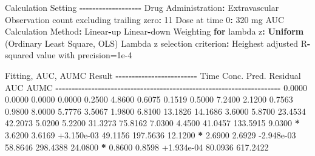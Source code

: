 \documentclass[
  12pt,
]{krantz}
\newenvironment{Shaded}{\begin{snugshade}}{\end{snugshade}}
\newcommand{\ControlFlowTok}[1]{\textcolor[rgb]{0.13,0.29,0.53}{\textbf{#1}}}
\newcommand{\DecValTok}[1]{\textcolor[rgb]{0.00,0.00,0.81}{#1}}
\newcommand{\FloatTok}[1]{\textcolor[rgb]{0.00,0.00,0.81}{#1}}
\newcommand{\KeywordTok}[1]{\textcolor[rgb]{0.13,0.29,0.53}{\textbf{#1}}}
\newcommand{\NormalTok}[1]{#1}
\newcommand{\OperatorTok}[1]{\textcolor[rgb]{0.81,0.36,0.00}{\textbf{#1}}}
\newcommand{\StringTok}[1]{\textcolor[rgb]{0.31,0.60,0.02}{#1}}
\begin{document}
\begin{Shaded}
\begin{Highlighting}[]
\NormalTok{Calculation Setting}
\OperatorTok{{-}{-}{-}{-}{-}{-}{-}{-}{-}{-}{-}{-}{-}{-}{-}{-}{-}{-}{-}}
\NormalTok{Drug Administration}\OperatorTok{:}\StringTok{ }\NormalTok{Extravascular}
\NormalTok{Observation count excluding trailing zero}\OperatorTok{:}\StringTok{ }\DecValTok{11}
\NormalTok{Dose at time }\DecValTok{0}\OperatorTok{:}\StringTok{ }\DecValTok{320}\NormalTok{ mg}
\NormalTok{AUC Calculation Method}\OperatorTok{:}\StringTok{ }\NormalTok{Linear}\OperatorTok{{-}}\NormalTok{up Linear}\OperatorTok{{-}}\NormalTok{down}
\NormalTok{Weighting }\ControlFlowTok{for}\NormalTok{ lambda z}\OperatorTok{:}\StringTok{ }\KeywordTok{Uniform}\NormalTok{ (Ordinary Least Square, OLS)}
\NormalTok{Lambda z selection criterion}\OperatorTok{:}\StringTok{ }\NormalTok{Heighest adjusted R}\OperatorTok{{-}}\NormalTok{squared value with precision=}\FloatTok{1e{-}4}


\NormalTok{Fitting, AUC, AUMC Result}
\OperatorTok{{-}{-}{-}{-}{-}{-}{-}{-}{-}{-}{-}{-}{-}{-}{-}{-}{-}{-}{-}{-}{-}{-}{-}{-}{-}}
\StringTok{      }\NormalTok{Time         Conc.      Pred.   Residual       AUC       AUMC}
\OperatorTok{{-}{-}{-}{-}{-}{-}{-}{-}{-}{-}{-}{-}{-}{-}{-}{-}{-}{-}{-}{-}{-}{-}{-}{-}{-}{-}{-}{-}{-}{-}{-}{-}{-}{-}{-}{-}{-}{-}{-}{-}{-}{-}{-}{-}{-}{-}{-}{-}{-}{-}{-}{-}{-}{-}{-}{-}{-}{-}{-}{-}{-}{-}{-}{-}{-}{-}{-}{-}{-}}
\StringTok{     }\FloatTok{0.0000}       \FloatTok{0.0000}                           \FloatTok{0.0000}     \FloatTok{0.0000}
     \FloatTok{0.2500}       \FloatTok{4.8600}                           \FloatTok{0.6075}     \FloatTok{0.1519}
     \FloatTok{0.5000}       \FloatTok{7.2400}                           \FloatTok{2.1200}     \FloatTok{0.7563}
     \FloatTok{0.9800}       \FloatTok{8.0000}                           \FloatTok{5.7776}     \FloatTok{3.5067}
     \FloatTok{1.9800}       \FloatTok{6.8100}                          \FloatTok{13.1826}    \FloatTok{14.1686}
     \FloatTok{3.6000}       \FloatTok{5.8700}                          \FloatTok{23.4534}    \FloatTok{42.2073}
     \FloatTok{5.0200}       \FloatTok{5.2200}                          \FloatTok{31.3273}    \FloatTok{75.8162}
     \FloatTok{7.0300}       \FloatTok{4.4500}                          \FloatTok{41.0457}   \FloatTok{133.5915}
     \FloatTok{9.0300} \OperatorTok{*}\StringTok{     }\FloatTok{3.6200}     \FloatTok{3.6169} \FloatTok{+3.150e{-}03}    \FloatTok{49.1156}   \FloatTok{197.5636}
    \FloatTok{12.1200} \OperatorTok{*}\StringTok{     }\FloatTok{2.6900}     \FloatTok{2.6929} \FloatTok{{-}2.948e{-}03}    \FloatTok{58.8646}   \FloatTok{298.4388}
    \FloatTok{24.0800} \OperatorTok{*}\StringTok{     }\FloatTok{0.8600}     \FloatTok{0.8598} \FloatTok{+1.934e{-}04}    \FloatTok{80.0936}   \FloatTok{617.2422}


\end{Highlighting}
\end{Shaded}
\end{document}
